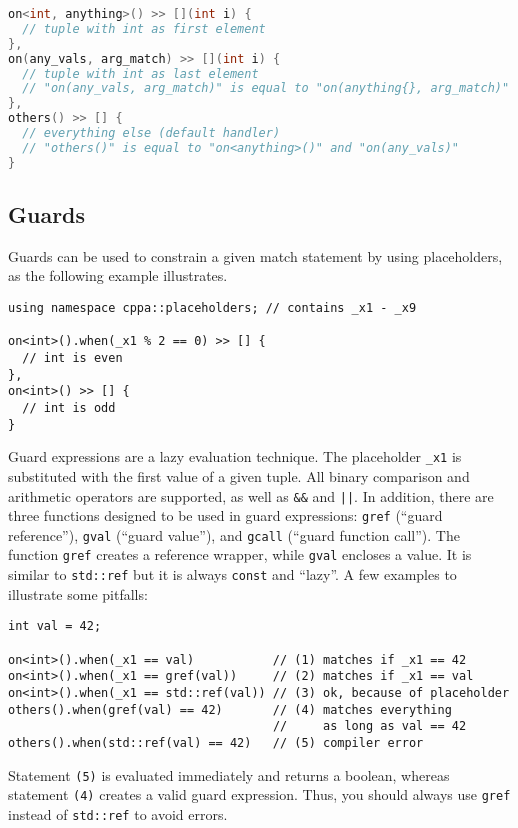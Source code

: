 \begin{lstlisting}[language=C++]
on<int, anything>() >> [](int i) {
  // tuple with int as first element
},
on(any_vals, arg_match) >> [](int i) {
  // tuple with int as last element
  // "on(any_vals, arg_match)" is equal to "on(anything{}, arg_match)"
},
others() >> [] {
  // everything else (default handler)
  // "others()" is equal to "on<anything>()" and "on(any_vals)"
}
\end{lstlisting}

\subsection{Guards}

Guards can be used to constrain a given match statement by using placeholders, as the following example illustrates.

\begin{lstlisting}
using namespace cppa::placeholders; // contains _x1 - _x9

on<int>().when(_x1 % 2 == 0) >> [] {
  // int is even
},
on<int>() >> [] {
  // int is odd
}
\end{lstlisting}

Guard expressions are a lazy evaluation technique.
The placeholder \lstinline^_x1^ is substituted with the first value of a given tuple.
All binary comparison and arithmetic operators are supported, as well as \lstinline^&&^ and \lstinline^||^.
In addition, there are three functions designed to be used in guard expressions: \lstinline^gref^ (``guard reference''), \lstinline^gval^ (``guard value''), and \lstinline^gcall^ (``guard function call'').
The function \lstinline^gref^ creates a reference wrapper, while \lstinline^gval^ encloses a value.
It is similar to \lstinline^std::ref^ but it is always \lstinline^const^ and ``lazy''.
A few examples to illustrate some pitfalls:

\begin{lstlisting}
int val = 42;

on<int>().when(_x1 == val)           // (1) matches if _x1 == 42
on<int>().when(_x1 == gref(val))     // (2) matches if _x1 == val
on<int>().when(_x1 == std::ref(val)) // (3) ok, because of placeholder
others().when(gref(val) == 42)       // (4) matches everything
                                     //     as long as val == 42
others().when(std::ref(val) == 42)   // (5) compiler error
\end{lstlisting}

Statement \texttt{(5)} is evaluated immediately and returns a boolean, whereas statement \texttt{(4)} creates a valid guard expression.
Thus, you should always use \lstinline^gref^ instead of \lstinline^std::ref^ to avoid errors.

